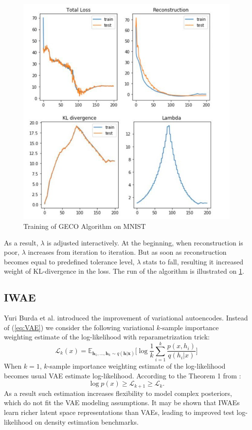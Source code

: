 \documentclass{article}
\begin{document}
\begin{figure}[!h]
\centering
  \includegraphics[width=0.5\linewidth]{pics/geco1}
\caption{\label{fig:geco}Training of GECO Algorithm on MNIST}
\end{figure}
  As a result, $\lambda$ is adjusted interactively. At the beginning, when reconstruction is poor, $\lambda$ increases from iteration to iteration. But as soon as reconstruction becomes equal to predefined tolerance level, $\lambda$ stats to fall, resulting it increased weight of KL-divergence in the loss. The run of the algorithm is illustrated on \ref{fig:geco}.

\subsection{IWAE}
Yuri Burda et al. \cite{iwae1} introduced the improvement of variational autoencodes. Instead of (\ref{eq:VAE}) we consider the following variational $k$-sample importance weighting estimate of the log-likelihood with reparametrization trick:
\begin{equation}
    \mathcal{L}_k(x) = \mathbb{E}_{\mathbf{h}_1, \dots, \mathbf{h}_k \sim q(\mathbf{h}|\mathbf{x})}\Big[\log \frac{1}{k} \sum_{i=1}^k \frac{p(x,h_i)}{q(h_i|x)}\Big]
\end{equation}
When $k=1$, $k$-sample importance weighting estimate of the log-likelihood becomes usual VAE estimate log-likelihood. According to the Theorem 1 from \cite{iwae1}:
\begin{equation}
    \log p(x) \geq \mathcal{L}_{k+1} \geq \mathcal{L}_k.
\end{equation}
As a result such estimation increases flexibility to model complex posteriors, which do not fit the VAE modeling assumptions. It may be shown that IWAEs learn richer latent space representations than VAEs, leading to improved test log-likelihood on density estimation benchmarks.
\end{document}
